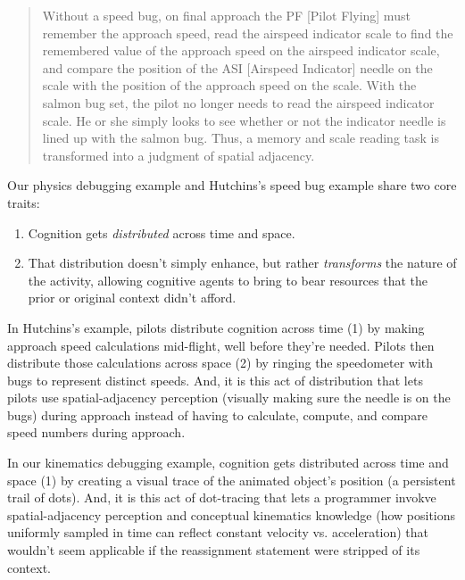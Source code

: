 \begin{quote}
  Without a speed bug, on final approach the PF [Pilot Flying] must remember the approach speed, read the airspeed indicator scale to find the remembered value of the approach speed on the airspeed indicator scale, and compare the position of the ASI [Airspeed Indicator] needle on the scale with the position of the approach speed on the scale. With the salmon bug set, the pilot no longer needs to read the airspeed indicator scale. He or she simply looks to see whether or not the indicator needle is lined up with the salmon bug. Thus, a memory and scale reading task is transformed into a judgment of spatial adjacency. \cite{hutchins_how_1995}
\end{quote}

Our physics debugging example and Hutchins's speed bug example \cite{hutchins_how_1995} share two core traits:

\begin{enumerate}
  \tightlist
  \item Cognition gets \emph{distributed} \cite{hutchins_distributed_2000,hutchins_cognition_1995} across time and space.
  \item That distribution doesn't simply enhance, but rather \emph{transforms} the nature of the activity, allowing cognitive agents to bring to bear resources that the prior or original context didn't afford.
\end{enumerate}

In Hutchins's \cite{hutchins_how_1995} example, pilots distribute cognition across time (1) by making approach speed calculations mid-flight, well before they're needed. Pilots then distribute those calculations across space (2) by ringing the speedometer with bugs to represent distinct speeds. And, it is this act of distribution that lets pilots use spatial-adjacency perception (visually making sure the needle is on the bugs) during approach instead of having to calculate, compute, and compare speed numbers during approach.

In our kinematics debugging example, cognition gets distributed across time and space (1) by creating a visual trace of the animated object's position (a persistent trail of dots). And, it is this act of dot-tracing that lets a programmer invokve spatial-adjacency perception and conceptual kinematics knowledge (how positions uniformly sampled in time can reflect constant velocity vs. acceleration) that wouldn't seem applicable if the reassignment statement were stripped of its context.

